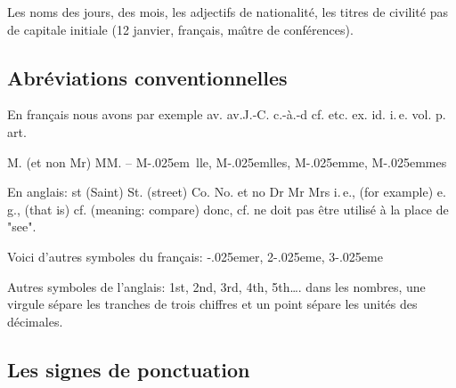 \documentclass[twoside]{article}
\begin{document}
Les noms des jours, des mois, les adjectifs de nationalit\'e, les
titres de civilit\'e pas de capitale initiale (12 janvier, fran\c cais,
ma\^{\i}tre de conf\'erences). 

\subsection{Abr\'eviations conventionnelles} 

En fran\c cais nous avons par exemple {\rmfamily
av. av.J.-C. c.-\`a.-d cf. etc. ex. id. i.\,e. vol. p. art.}

{\rmfamily M. (et non Mr) MM. -- M\kern-.025em\hbox{\small
lle}, M\kern-.025em\hbox{\small lles},
M\kern-.025em\hbox{\small me},
M\kern-.025em\hbox{\small mes}}

En anglais: {\rmfamily st (Saint) St. (street) Co. No. et no Dr Mr
Mrs i.\,e., (for example) e.\,g., (that is) cf. (meaning: compare)}
donc, cf. ne doit pas \^etre utilis\'e \`a la place de "see".

\medskip

Voici d'autres symboles du fran\c cais: {\kern-.025em\hbox{\small er},
2\kern-.025em\hbox{\small e},
3\kern-.025em\hbox{\small e}}


Autres symboles de l'anglais: {\rmfamily 1st, 2nd, 3rd, 4th,
5th\ldots}. dans les nombres, une virgule s\'epare les tranches de
trois chiffres et un point s\'epare les unit\'es des d\'ecimales.


\subsection{Les signes de ponctuation} 
\end{document}
